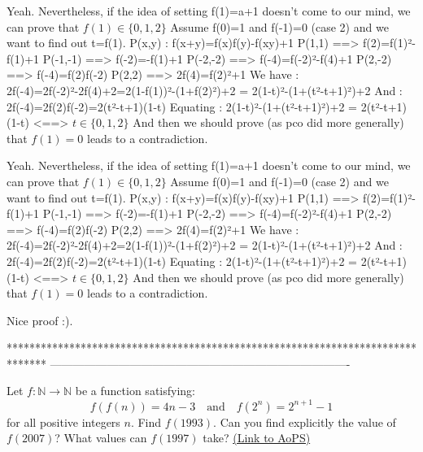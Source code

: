 \begin{solution}
	Yeah. Nevertheless, if the idea of setting f(1)=a+1 doesn't come to our mind, we can prove that $f(1) \in \{0,1,2\}$
Assume f(0)=1 and f(-1)=0 (case 2) and we want to find out t=f(1).
P(x,y) : f(x+y)=f(x)f(y)-f(xy)+1
P(1,1) ==> f(2)=f(1)²-f(1)+1
P(-1,-1) ==> f(-2)=-f(1)+1
P(-2,-2) ==> f(-4)=f(-2)²-f(4)+1
P(2,-2) ==> f(-4)=f(2)f(-2)
P(2,2) ==> 2f(4)=f(2)²+1
We have : 2f(-4)=2f(-2)²-2f(4)+2=2(1-f(1))²-(1+f(2)²)+2 = 2(1-t)²-(1+(t²-t+1)²)+2 
And : 2f(-4)=2f(2)f(-2)=2(t²-t+1)(1-t)
Equating : 2(1-t)²-(1+(t²-t+1)²)+2 = 2(t²-t+1)(1-t)
<==> $t \in \{0,1,2\}$
And then we should prove (as pco did more generally) that $f(1)=0$ leads to a contradiction.
\end{solution}



\begin{solution}
	\begin{tcolorbox}Yeah. Nevertheless, if the idea of setting f(1)=a+1 doesn't come to our mind, we can prove that $f(1) \in \{0,1,2\}$
Assume f(0)=1 and f(-1)=0 (case 2) and we want to find out t=f(1).
P(x,y) : f(x+y)=f(x)f(y)-f(xy)+1
P(1,1) ==> f(2)=f(1)²-f(1)+1
P(-1,-1) ==> f(-2)=-f(1)+1
P(-2,-2) ==> f(-4)=f(-2)²-f(4)+1
P(2,-2) ==> f(-4)=f(2)f(-2)
P(2,2) ==> 2f(4)=f(2)²+1
We have : 2f(-4)=2f(-2)²-2f(4)+2=2(1-f(1))²-(1+f(2)²)+2 = 2(1-t)²-(1+(t²-t+1)²)+2 
And : 2f(-4)=2f(2)f(-2)=2(t²-t+1)(1-t)
Equating : 2(1-t)²-(1+(t²-t+1)²)+2 = 2(t²-t+1)(1-t)
<==> $t \in \{0,1,2\}$
And then we should prove (as pco did more generally) that $f(1)=0$ leads to a contradiction.\end{tcolorbox}
Nice proof :).
\end{solution}
*******************************************************************************
-------------------------------------------------------------------------------

\begin{problem}
	Let $f:\mathbb{N}\to \mathbb{N}$ be a function satisfying:
\[f(f(n))=4n-3 \quad \text{and} \quad f(2^n)=2^{n+1}-1\]
for all positive integers $n$. Find $ f(1993)$. Can you find explicitly the value of $ f(2007)$? What values can $f(1997)$ take?
	\flushright \href{https://artofproblemsolving.com/community/c6h401323}{(Link to AoPS)}
\end{problem}



